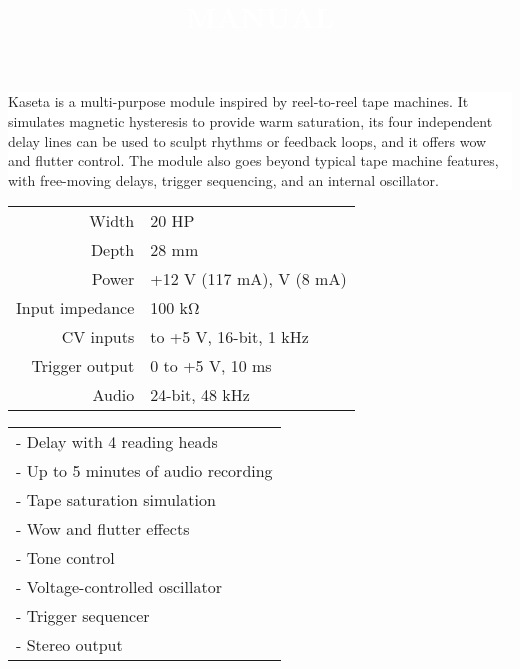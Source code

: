 \documentclass[11pt]{article}
\begin{document}
\pagecolor{black}\afterpage{\nopagecolor}

\title{\textcolor{white}{MANUAL}}
\author{}
\date{}

\begin{minipage}{0.4\textwidth}
\color{white}
\maketitle

\noindent\colorbox{white}
{
\begin{minipage}{0.85\textwidth}\color{black}
Kaseta is a multi-purpose module inspired by reel-to-reel tape machines. It
simulates magnetic hysteresis to provide warm saturation, its four independent
delay lines can be used to sculpt rhythms or feedback loops, and it offers wow
and flutter control. The module also goes beyond typical tape machine features,
with free-moving delays, trigger sequencing, and an internal oscillator.
\end{minipage}
}

\vspace{1cm}

\begin{minipage}{0.8\textwidth}\color{white}
\begin{tabular}{@{}rl@{}}
  Width & 20 HP \\
  Depth & 28 mm \\
  Power & +12 V (117 mA), \textminus12 V (8 mA) \\
  Input impedance & 100 kΩ \\
  CV inputs & \textminus5 to +5 V, 16-bit, 1 kHz \\
  Trigger output & 0 to +5 V, 10 ms \\
  Audio & 24-bit, 48 kHz
\end{tabular}
\end{minipage}

\vspace{1cm}

\begin{minipage}{0.8\textwidth}\color{white}
\begin{tabular}{@{}l}
  - Delay with 4 reading heads \\
  - Up to 5 minutes of audio recording \\
  - Tape saturation simulation \\
  - Wow and flutter effects \\
  - Tone control \\
  - Voltage-controlled oscillator \\
  - Trigger sequencer \\
  - Stereo output
\end{tabular}
\end{minipage}

\end{minipage}%
\end{document}
